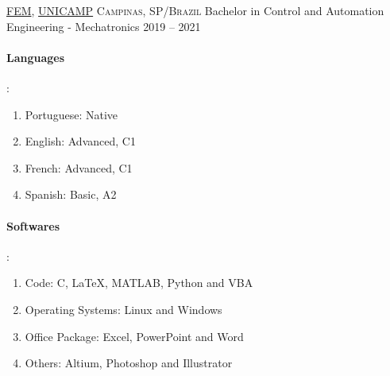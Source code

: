 \documentclass[10pt, a4paper]{article}
\begin{document}
\headedsection
    {\href{https://www.fem.unicamp.br/index.php/pt-br/}{FEM}, \href{https://www.unicamp.br/unicamp/universidade}{UNICAMP}}
    {\textsc{Campinas, SP/Brazil}}
    {
    \headedsubsection
        {Bachelor in Control and Automation Engineering - Mechatronics}
        {2019 -- 2021}
        {\bodytext{}}
    }

\spacedhrule{0.5em}{-0.4em}



\begin{multicols}{2}
    \paragraph{Languages}:
    \begin{enumerate}
        \item Portuguese: Native
        \item English: Advanced, C1
        \item French: Advanced, C1
        \item Spanish: Basic, A2
    \end{enumerate}
    \columnbreak
    \paragraph{Softwares}:
    \begin{enumerate}
        \item Code: C, LaTeX, MATLAB, Python and VBA
        \item Operating Systems: Linux and Windows
        \item Office Package: Excel, PowerPoint and Word
        \item Others: Altium, Photoshop and Illustrator
    \end{enumerate}
\end{multicols}
\end{document}

